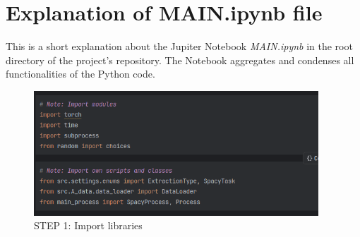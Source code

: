 \chapter{Explanation of \textbf{MAIN.ipynb} file}\label{ch:explanation-of-main-file}

This is a short explanation about the Jupiter Notebook \emph{MAIN.ipynb} in the root directory of the project's repository.
The Notebook aggregates and condenses all functionalities of the Python code.

\begin{figure}[H]   %
    \centering
    \includegraphics[width=0.95\textwidth]{Assets/main-1}
    \caption{STEP 1: Import libraries}
    \label{fig:main-1}
\end{figure}

